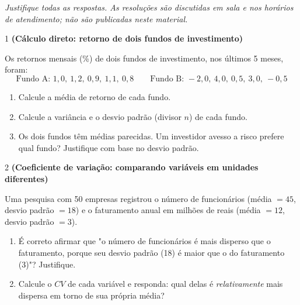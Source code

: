 \documentclass[11pt]{article}
\begin{document}

\noindent \textit{Justifique todas as respostas. As resoluções são discutidas em sala e nos horários de atendimento; não são publicadas neste material.}

\begin{questao}{1} \textbf{(Cálculo direto: retorno de dois fundos de investimento)}

Os retornos mensais (\%) de dois fundos de investimento, nos últimos 5 meses, foram:
$$
\text{Fundo A: } 1{,}0,\ 1{,}2,\ 0{,}9,\ 1{,}1,\ 0{,}8 \qquad
\text{Fundo B: } -2{,}0,\ 4{,}0,\ 0{,}5,\ 3{,}0,\ -0{,}5
$$

\begin{enumerate}[label=(\alph*)]
  \item Calcule a média de retorno de cada fundo.
  \item Calcule a variância e o desvio padrão (divisor $n$) de cada fundo.
  \item Os dois fundos têm médias parecidas. Um investidor avesso a risco prefere qual fundo?
    Justifique com base no desvio padrão.
\end{enumerate}
\end{questao}

\begin{questao}{2} \textbf{(Coeficiente de variação: comparando variáveis em unidades diferentes)}

Uma pesquisa com 50 empresas registrou o número de funcionários (média $=45$, desvio padrão
$=18$) e o faturamento anual em milhões de reais (média $=12$, desvio padrão $=3$).

\begin{enumerate}[label=(\alph*)]
  \item É correto afirmar que "o número de funcionários é mais disperso que o faturamento, porque
    seu desvio padrão (18) é maior que o do faturamento (3)"? Justifique.
  \item Calcule o $CV$ de cada variável e responda: qual delas é \emph{relativamente} mais
    dispersa em torno de sua própria média?
\end{enumerate}
\end{questao}
\end{document}
